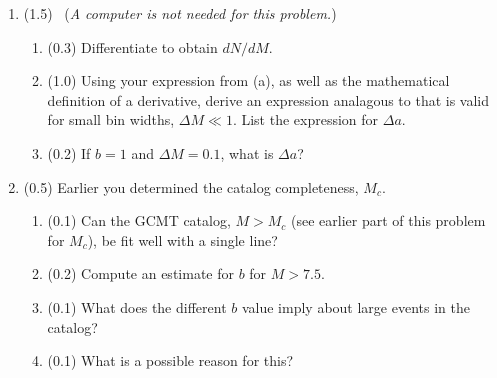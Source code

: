 \documentclass[11pt,titlepage,fleqn]{article}
\begin{document}
\begin{enumerate}
\begin{enumerate}
\item (0.1) The equation answering the previous problem provides a mathematical relationship between bin width and the shift in the $y$-intercept. Describe in words what happens for increasing $\Delta M$.

\item (0.2) If $b = 1$ and $\Delta M = 0.1$, what is $\Delta a$?
\end{enumerate}


\item  (1.5) \ptag\ ({\em A computer is not needed for this problem.})
%
\begin{enumerate}
\item (0.3) Differentiate  to obtain $d N/ d M$.


\item (1.0) Using your expression from (a), as well as the mathematical definition of a derivative, derive an expression analagous to  that is valid for small bin widths, $\Delta M \ll 1$. List the expression for $\Delta a$.

\item (0.2) If $b = 1$ and $\Delta M = 0.1$, what is $\Delta a$?

\end{enumerate}


\item (0.5) Earlier you determined the catalog completeness, $M_c$.
%
\begin{enumerate}
\item (0.1) Can the GCMT catalog, $M > M_c$ (see earlier part of this problem for $M_c$), be fit well with a single line?
\item (0.2) Compute an estimate for $b$ for $M > 7.5$.
\item (0.1) What does the different $b$ value imply about large events in the catalog?
\item (0.1) What is a possible reason for this?
\end{enumerate}

\end{enumerate}

\end{document}
